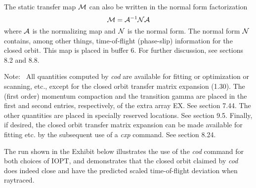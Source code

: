 The static transfer map ${\cal M}$ can also be written in the normal
form factorization
\begin{equation}
	  {\cal M} = {\cal A}^{-1} {\cal N} {\cal A}
\end{equation}
where ${\cal A}$ is the normalizing map and ${\cal N}$ is the normal
form.   The normal form ${\cal N}$ contains, among other things,
time-of-flight (phase-slip) information for the closed orbit.  This map
is placed in buffer 6.  For
further discussion, see sections 8.2 and 8.8.

Note: \ All quantities computed by {\em cod} are available for fitting or optimization or scanning, etc., except for the closed orbit transfer matrix expansion (1.30).  The (first order) momentum compaction and the transition gamma are placed in the first and second entries, respectively, of the extra array EX.  See section 7.44.  The other quantities are placed in specially reserved locations.  See section 9.5.  Finally, if desired, the closed orbit transfer matrix expansion can be made available for fitting etc. by the subsequent use of a {\em cxp} command.  See section 8.24.

The \Mary run shown in the Exhibit below illustrates the use of the {\em cod} command for both choices of IOPT, and demonstrates that the closed orbit claimed by {\em cod} does indeed close and have the predicted scaled time-of-flight deviation when raytraced.

